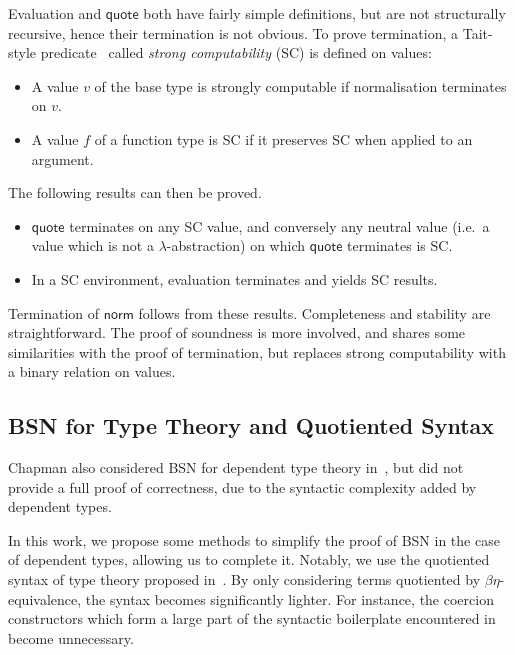 \documentclass[a4paper,UKenglish,cleveref]{lipics-v2019}
\newcommand{\agdaSymb}[1]{\mathsf{#1}}
\newcommand{\q}{\agdaSymb{quote}}
\newcommand{\norm}{\agdaSymb{norm}}
\begin{document}
Evaluation and $\q$ both have fairly simple definitions, but are
not structurally recursive, hence their termination is not obvious.
To prove termination, a Tait-style predicate~\cite{tait1967} called
\emph{strong computability} (SC) is defined on values:
\begin{itemize}
\item A value $v$ of the base type is strongly computable if normalisation
  terminates on $v$.
\item A value $f$ of a function type is SC if it preserves SC when applied to
  an argument.
\end{itemize}
The following results can then be proved.
\begin{itemize}
\item $\q$ terminates on any SC value, and conversely any neutral value (i.e.\
  a value which is not a $\lambda$-abstraction) on which
  $\q$ terminates is SC.
\item In a SC environment, evaluation terminates and yields SC results.
\end{itemize}
Termination of $\norm$ follows from these results. Completeness and
stability are straightforward. The proof of soundness is more involved, and
shares some similarities with the proof of termination, but replaces strong
computability with a binary relation on values.

\subsection{BSN for Type Theory and Quotiented Syntax}
Chapman also considered BSN for dependent type theory in~\cite{chapman2009type},
but did not provide a full proof of correctness, due to the syntactic
complexity added by dependent types.

In this work, we propose some methods to simplify the proof of BSN in the case
of dependent types, allowing us to complete it.
Notably, we use the quotiented syntax of type theory proposed
in~\cite{kaposi2016type}. By only considering terms quotiented by
$\beta\eta$-equivalence, the syntax becomes significantly lighter. For
instance, the coercion constructors which form a large part of the syntactic
boilerplate encountered in~\cite{chapman2009type} become unnecessary.
\end{document}
